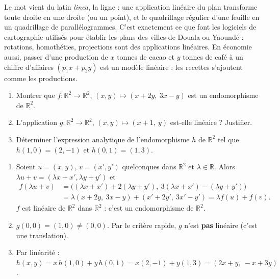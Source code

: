 \documentclass[11pt]{article}
\begin{document}
\begin{savaistu}
Le mot vient du latin \emph{linea}, la ligne : une application linéaire du plan transforme toute droite en une droite (ou un point), et le quadrillage régulier d'une feuille en un quadrillage de parallélogrammes. C'est exactement ce que font les logiciels de cartographie utilisés pour établir les plans des villes de Douala ou Yaoundé : rotations, homothéties, projections sont des applications linéaires. En économie aussi, passer d'une production de $x$ tonnes de cacao et $y$ tonnes de café à un chiffre d'affaires $(p_1 x + p_2 y)$ est un modèle linéaire : les recettes s'ajoutent comme les productions.
\end{savaistu}

\begin{exercice}
\begin{enumerate}
\item Montrer que $f : \mathbb{R}^2 \to \mathbb{R}^2$, $(x, y) \mapsto (x + 2y,\ 3x - y)$ est un endomorphisme de $\mathbb{R}^2$.
\item L'application $g : \mathbb{R}^2 \to \mathbb{R}^2$, $(x, y) \mapsto (x + 1,\ y)$ est-elle linéaire ? Justifier.
\item Déterminer l'expression analytique de l'endomorphisme $h$ de $\mathbb{R}^2$ tel que $h(1, 0) = (2, -1)$ et $h(0, 1) = (1, 3)$.
\end{enumerate}
\end{exercice}

\begin{corrige}[Exercices 1 à 3]
\begin{enumerate}
\item Soient $u = (x, y)$, $v = (x', y')$ quelconques dans $\mathbb{R}^2$ et $\lambda \in \mathbb{R}$. Alors $\lambda u + v = (\lambda x + x', \lambda y + y')$ et
\begin{align*}
f(\lambda u + v) &= \big((\lambda x + x') + 2(\lambda y + y'),\ 3(\lambda x + x') - (\lambda y + y')\big) \\
&= \lambda(x + 2y,\ 3x - y) + (x' + 2y',\ 3x' - y') = \lambda f(u) + f(v).
\end{align*}
$f$ est linéaire de $\mathbb{R}^2$ dans $\mathbb{R}^2$ : c'est un endomorphisme de $\mathbb{R}^2$.
\item $g(0, 0) = (1, 0) \neq (0, 0)$. Par le critère rapide, $g$ n'est \textbf{pas} linéaire (c'est une translation).
\item Par linéarité : $h(x, y) = x\,h(1,0) + y\,h(0,1) = x(2, -1) + y(1, 3) = (2x + y,\ -x + 3y)$.
\end{enumerate}
\end{corrige}
\end{document}
